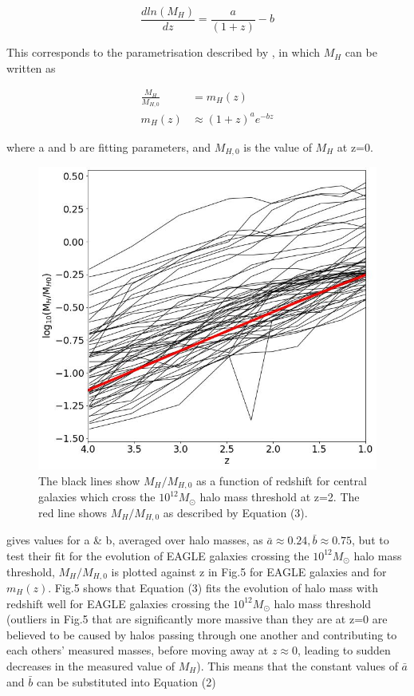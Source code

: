 \documentclass[12pt, twocolumn]{report}%
\begin{document}
\begin{equation}
    \frac{dln(M_H)}{dz}=\frac{a}{(1+z)}-b
\end{equation}

\noindent This corresponds to the parametrisation described by \cite{Correa}, in which $M_H$ can be written as

\begin{align}
    \frac{M_H}{M_{H,0}}&=m_H(z) \nonumber \\
    m_H(z)&\approx(1+z)^ae^{-bz}
\end{align}

\noindent where a and b are fitting parameters, and $M_{H,0}$ is the value of $M_H$ at z=0. \cite{Correa}

\begin{figure}[H]
\centering
\includegraphics[width=\linewidth]{Plot_5.jpeg}
\caption{The black lines show $M_H/M_{H,0}$ as a function of redshift for central galaxies which cross the $10^{12}M_\odot$ halo mass threshold at z=2. The red line shows $M_H/M_{H,0}$ as described by Equation (3).}
\label{fig:5}
\end{figure}

\noindent gives values for a \& b, averaged over halo masses, as $\bar a \approx 0.24, \bar b \approx 0.75$, but to test their fit for the evolution of EAGLE galaxies crossing the $10^{12}M_\odot$ halo mass threshold, $M_H/M_{H,0}$ is plotted against z in Fig.5 for EAGLE galaxies and for $m_H(z)$. Fig.5 shows that Equation (3) fits the evolution of halo mass with redshift well for EAGLE galaxies crossing the $10^{12}M_\odot$ halo mass threshold (outliers in Fig.5 that are significantly more massive than they are at z=0 are believed to be caused by halos passing through one another and contributing to each others' measured masses, before moving away at $z\approx0$, leading to  sudden decreases in the measured value of $M_H$). This means that the constant values of $\bar a$ and $\bar b$ can be substituted into Equation (2)
\end{document}
